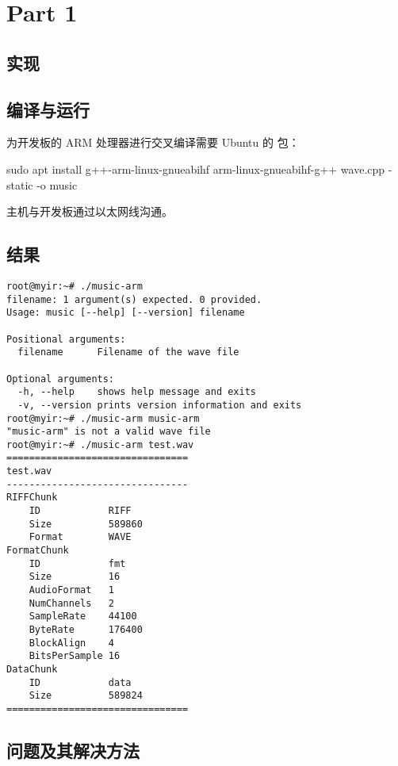 \section{Part 1}


\subsection{实现}

\subsection{编译与运行}

为开发板的 ARM 处理器进行交叉编译需要 Ubuntu 的  包：

\begin{codeblock}
sudo apt install g++-arm-linux-gnueabihf
arm-linux-gnueabihf-g++ wave.cpp -static -o music
\end{codeblock}

主机与开发板通过以太网线沟通。

\newpage

\subsection{结果}



\begin{verbatim}
root@myir:~# ./music-arm 
filename: 1 argument(s) expected. 0 provided.
Usage: music [--help] [--version] filename

Positional arguments:
  filename      Filename of the wave file

Optional arguments:
  -h, --help    shows help message and exits
  -v, --version prints version information and exits
root@myir:~# ./music-arm music-arm 
"music-arm" is not a valid wave file
root@myir:~# ./music-arm test.wav 
================================
test.wav
--------------------------------
RIFFChunk
    ID            RIFF
    Size          589860
    Format        WAVE
FormatChunk
    ID            fmt
    Size          16
    AudioFormat   1
    NumChannels   2
    SampleRate    44100
    ByteRate      176400
    BlockAlign    4
    BitsPerSample 16
DataChunk
    ID            data
    Size          589824
================================
\end{verbatim}


\subsection{问题及其解决方法}

